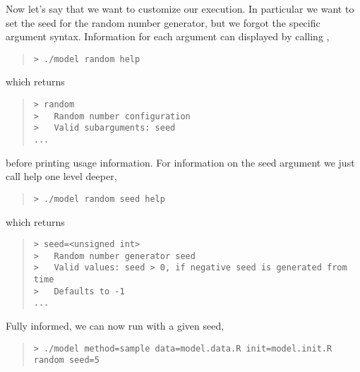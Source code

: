 Now let's say that we want to customize our execution.  In
particular we want to set the seed for the random number generator,
but we forgot the specific argument syntax.  Information for each
argument can displayed by calling ,
%
\begin{quote}
\begin{Verbatim}[fontshape=sl,fontsize=\small]
> ./model random help
\end{Verbatim}
\end{quote}
%
which returns
%
\begin{quote}
\begin{Verbatim}[fontshape=sl,fontsize=\small]
> random
>   Random number configuration
>   Valid subarguments: seed
...
\end{Verbatim}
\end{quote}
%
before printing usage information.  For information on the 
seed argument we just call help one level deeper,
%
\begin{quote}
\begin{Verbatim}[fontshape=sl,fontsize=\small]
> ./model random seed help
\end{Verbatim}
\end{quote}
%
which returns
%
\begin{quote}
\begin{Verbatim}[fontshape=sl,fontsize=\small]
> seed=<unsigned int>
>   Random number generator seed
>   Valid values: seed > 0, if negative seed is generated from time
>   Defaults to -1
...
\end{Verbatim}
\end{quote}
%
Fully informed, we can now run with a given seed,
%
\begin{quote}
\begin{Verbatim}[fontshape=sl,fontsize=\small]
> ./model method=sample data=model.data.R init=model.init.R random seed=5
\end{Verbatim}
\end{quote}

